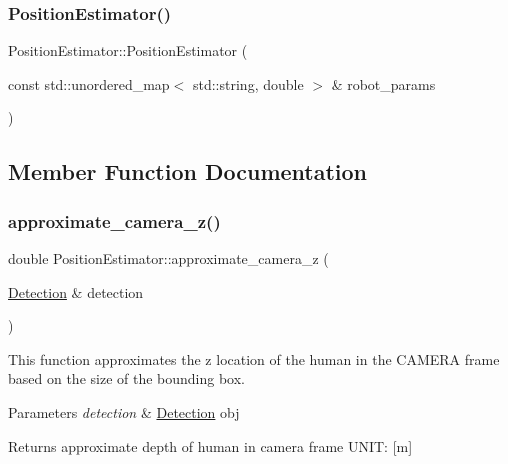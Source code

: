\mbox{\label{class_position_estimator_af0b8305de010b7f15f0b18499d8d50c3}} 
\subsubsection{\texorpdfstring{Position\+Estimator()}{PositionEstimator()}\hspace{0.1cm}{\footnotesize\ttfamily [2/2]}}
{\footnotesize\ttfamily Position\+Estimator\+::\+Position\+Estimator (\begin{DoxyParamCaption}\item[{const std\+::unordered\+\_\+map$<$ std\+::string, double $>$ \&}]{robot\+\_\+params }\end{DoxyParamCaption})\hspace{0.3cm}{\ttfamily [inline]}}



\subsection{Member Function Documentation}
\mbox{\label{class_position_estimator_aaa7e82a010bfb5dbcc795af9718c9eb0}} 
\subsubsection{\texorpdfstring{approximate\+\_\+camera\+\_\+z()}{approximate\_camera\_z()}}
{\footnotesize\ttfamily double Position\+Estimator\+::approximate\+\_\+camera\+\_\+z (\begin{DoxyParamCaption}\item[{\hyperlink{struct_detection}{Detection} \&}]{detection }\end{DoxyParamCaption})}



This function approximates the z location of the human in the C\+A\+M\+E\+RA frame based on the size of the bounding box. 


\begin{DoxyParams}{Parameters}
{\em detection} & \hyperlink{struct_detection}{Detection} obj \\
\hline
\end{DoxyParams}
\begin{DoxyReturn}{Returns}
approximate depth of human in camera frame U\+N\+IT\+: \mbox{[}m\mbox{]} 
\end{DoxyReturn}
\mbox{\label{class_position_estimator_a9bc700bc3de4749f5ec40a892c52a09d}} 

